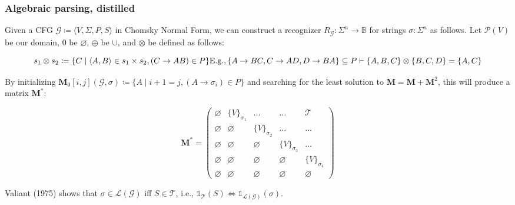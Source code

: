 \documentclass{beamer}
\begin{document}
    \begin{frame}[fragile]
        \frametitle{Algebraic parsing, distilled}
        Given a CFG $\mathcal{G} \coloneqq \langle V, \Sigma, P, S\rangle$ in Chomsky Normal Form, we can construct a recognizer $R_\mathcal{G}: \Sigma^n \rightarrow \mathbb{B}$ for strings $\sigma: \Sigma^n$ as follows. Let $\mathcal P(V)$ be our domain, $0$ be $\varnothing$, $\oplus$ be $\cup$, and $\otimes$ be defined as follows:

        \vspace{-7pt}
        \[
            s_1 \otimes s_2 \coloneqq \{C \mid \langle A, B\rangle \in s_1 \times s_2, (C\rightarrow AB) \in P\}\\
            \text{E.g.},
                \{A \rightarrow BC, C \rightarrow AD, D \rightarrow BA\} \subseteq P \vdash \{A, B, C\} \otimes \{B, C, D\} = \{A, C\}
        \]
        \vspace{16pt}

        \noindent By initializing $\mathbf{M}_0[i, j](\mathcal{G}, \sigma) \coloneqq \{A \mid i + 1 = j, (A \rightarrow \sigma_i) \in P\}$ and searching for the least solution to $\mathbf{M} = \mathbf{M} + \mathbf{M}^2$, this will produce a matrix $\mathbf{M}^*$:

        \vspace{-5}
        \[
            \mathbf{M}^* = \begin{pmatrix}
                               \varnothing & \{V\}_{\sigma_1} & \ldots & \ldots & \mathcal{T} \\
                               \varnothing & \varnothing & \{V\}_{\sigma_2} & \ldots & \ldots \\
                               \varnothing & \varnothing & \varnothing & \{V\}_{\sigma_3} & \ldots \\
                               \varnothing & \varnothing & \varnothing & \varnothing & \{V\}_{\sigma_4} \\
                               \varnothing & \varnothing & \varnothing & \varnothing & \varnothing
            \end{pmatrix}
        \]

        \noindent Valiant (1975) shows that $\sigma \in \mathcal{L}(\mathcal{G})$ iff $S \in \mathcal{T}$, i.e., $\mathds{1}_{\mathcal{T}}(S) \iff \mathds{1}_{\mathcal{L}(\mathcal{G})}(\sigma)$.
    \end{frame}
\end{document}
